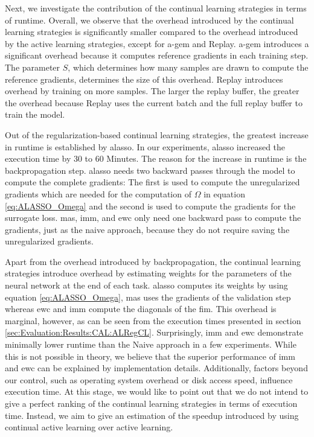 Next, we investigate the contribution of the continual learning strategies in terms of runtime. Overall, we observe that the overhead introduced by the
continual learning strategies is significantly smaller compared to the overhead introduced by the active learning strategies, except for \gls{a-gem}
and Replay. \gls{a-gem} introduces a significant overhead because it computes reference gradients in each training step. The parameter $S$, which determines
how many samples are drawn to compute the reference gradients, determines the size of this overhead. Replay introduces overhead by training
on more samples. The larger the replay buffer, the greater the overhead because Replay uses the current batch and the full replay buffer to train the model.

Out of the regularization-based continual learning strategies, the greatest increase in runtime is established by \gls{alasso}. In our experiments,
\gls{alasso} increased the execution time by 30 to 60 Minutes. The reason for the increase in runtime is the backpropagation step. \gls{alasso} needs
two backward passes through the model to compute the complete gradients: The first is used to compute the unregularized gradients which are needed for
the computation of $\Omega$ in equation \ref{eq:ALASSO_Omega} and the second is used to compute the gradients for the surrogate loss. \gls{mas},
\gls{imm}, and \gls{ewc} only need one backward pass to compute the gradients, just as the naive approach, because they do not require saving the
unregularized gradients. \par
Apart from the overhead introduced by backpropagation, the continual learning strategies introduce overhead by estimating weights for the parameters of
the neural network at the end of each task. \gls{alasso} computes its weights by using equation \ref{eq:ALASSO_Omega}, \gls{mas} uses the gradients of
the validation step whereas \gls{ewc} and \gls{imm} compute the diagonals of the \gls{fim}. This overhead is marginal, however, as can be seen from the
execution times presented in section \ref{sec:Evaluation:Results:CAL:ALRegCL}. Surprisingly, \gls{imm} and \gls{ewc} demonstrate minimally lower runtime
than the Naive approach in a few experiments. While this is not possible in theory, we believe that the superior performance of \gls{imm} and \gls{ewc}
can be explained by implementation details. Additionally, factors beyond our control, such as operating system overhead or disk access speed, influence execution time.
At this stage, we would like to point out that we do not intend to give a perfect ranking of the continual learning strategies in terms of execution time.
Instead, we aim to give an estimation of the speedup introduced by using continual active learning over active learning. \par



